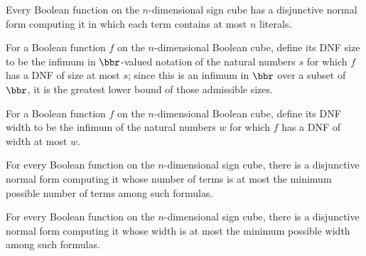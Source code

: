 \begin{theorem}
\label{FABL.hasDNFWidthLE_dimension}
\leanok
{}
Every Boolean function on the $n$-dimensional sign cube has a disjunctive normal form
computing it in which each term contains at most $n$ literals.
\end{theorem}

\begin{definition}
\label{FABL.DNFsize}
\leanok
{}
For a Boolean function $f$ on the $n$-dimensional Boolean cube, define its DNF size to
be the infimum in $\bbr$-valued notation of the natural numbers $s$ for which $f$ has a
DNF of size at most $s$; since this is an infimum in $\bbr$ over a subset of $\bbr$, it is
the greatest lower bound of those admissible sizes.
\end{definition}

\begin{definition}
\label{FABL.DNFwidth}
\leanok
{}
For a Boolean function $f$ on the $n$-dimensional Boolean cube, define its DNF width to
be the infimum of the natural numbers $w$ for which $f$ has a DNF of width at most $w$.
\end{definition}

\begin{theorem}
\label{FABL.hasDNFSizeLE_DNFsize}
\leanok
{}
For every Boolean function on the $n$-dimensional sign cube, there is a disjunctive
normal form computing it whose number of terms is at most the minimum possible number of
terms among such formulas.
\end{theorem}

\begin{theorem}
\label{FABL.hasDNFWidthLE_DNFwidth}
\leanok
{}
For every Boolean function on the $n$-dimensional sign cube, there is a disjunctive
normal form computing it whose width is at most the minimum possible width among such
formulas.
\end{theorem}

